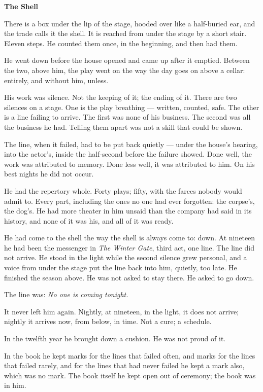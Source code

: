 \documentclass[11pt]{article}
\begin{document}
\begin{center}
{\LARGE\bfseries The Shell}
\end{center}
\bigskip
\noindent There is a box under the lip of the stage, hooded over like a half-buried ear, and the trade calls it the shell. It is reached from under the stage by a short stair. Eleven steps. He counted them once, in the beginning, and then had them.

He went down before the house opened and came up after it emptied. Between the two, above him, the play went on the way the day goes on above a cellar: entirely, and without him, unless.

His work was silence. Not the keeping of it; the ending of it. There are two silences on a stage. One is the play breathing — written, counted, safe. The other is a line failing to arrive. The first was none of his business. The second was all the business he had. Telling them apart was not a skill that could be shown.

The line, when it failed, had to be put back quietly — under the house's hearing, into the actor's, inside the half-second before the failure showed. Done well, the work was attributed to memory. Done less well, it was attributed to him. On his best nights he did not occur.

He had the repertory whole. Forty plays; fifty, with the farces nobody would admit to. Every part, including the ones no one had ever forgotten: the corpse's, the dog's. He had more theater in him unsaid than the company had said in its history, and none of it was his, and all of it was ready.

He had come to the shell the way the shell is always come to: down. At nineteen he had been the messenger in \emph{The Winter Gate}, third act, one line. The line did not arrive. He stood in the light while the second silence grew personal, and a voice from under the stage put the line back into him, quietly, too late. He finished the season above. He was not asked to stay there. He asked to go down.

The line was: \emph{No one is coming tonight.}

It never left him again. Nightly, at nineteen, in the light, it does not arrive; nightly it arrives now, from below, in time. Not a cure; a schedule.

In the twelfth year he brought down a cushion. He was not proud of it.

In the book he kept marks for the lines that failed often, and marks for the lines that failed rarely, and for the lines that had never failed he kept a mark also, which was no mark. The book itself he kept open out of ceremony; the book was in him.
\end{document}

